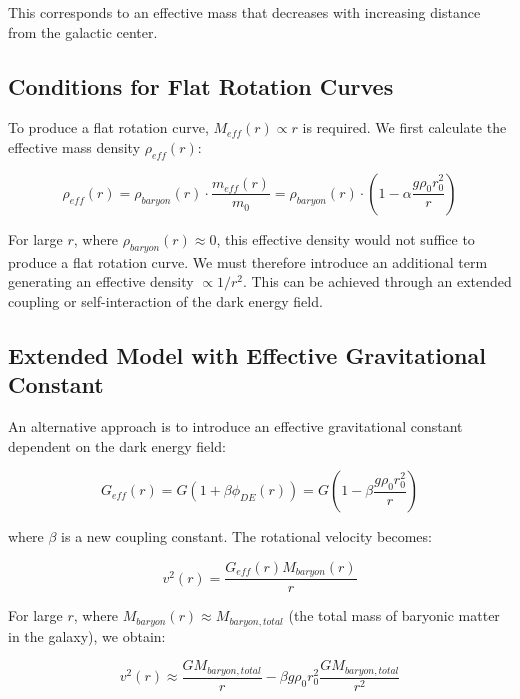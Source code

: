 \documentclass[a4paper,12pt]{article}
\begin{document}
This corresponds to an effective mass that decreases with increasing distance from the galactic center.

\subsection{Conditions for Flat Rotation Curves}

To produce a flat rotation curve, $M_{eff}(r) \propto r$ is required. We first calculate the effective mass density $\rho_{eff}(r)$:

\begin{equation}
	\rho_{eff}(r) = \rho_{baryon}(r) \cdot \frac{m_{eff}(r)}{m_0} = \rho_{baryon}(r) \cdot \left(1 - \alpha\frac{g\rho_0 r_0^2}{r}\right)
\end{equation}

For large $r$, where $\rho_{baryon}(r) \approx 0$, this effective density would not suffice to produce a flat rotation curve. We must therefore introduce an additional term generating an effective density $\propto 1/r^2$. This can be achieved through an extended coupling or self-interaction of the dark energy field.

\subsection{Extended Model with Effective Gravitational Constant}

An alternative approach is to introduce an effective gravitational constant dependent on the dark energy field:

\begin{equation}
	G_{eff}(r) = G\left(1 + \beta\phi_{DE}(r)\right) = G\left(1 - \beta\frac{g\rho_0 r_0^2}{r}\right)
\end{equation}

where $\beta$ is a new coupling constant. The rotational velocity becomes:

\begin{equation}
	v^2(r) = \frac{G_{eff}(r)M_{baryon}(r)}{r}
\end{equation}

For large $r$, where $M_{baryon}(r) \approx M_{baryon,total}$ (the total mass of baryonic matter in the galaxy), we obtain:

\begin{equation}
	v^2(r) \approx \frac{GM_{baryon,total}}{r} - \beta g\rho_0 r_0^2 \frac{GM_{baryon,total}}{r^2}
\end{equation}
\end{document}

